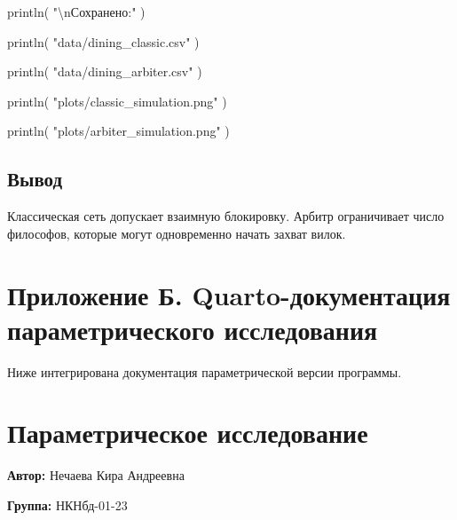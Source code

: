 \documentclass[
  english,
  russian,
  12pt,
  a4paper,
  DIV=11,
  numbers=noendperiod]{scrreprt}
\newenvironment{Shaded}{\begin{snugshade}}{\end{snugshade}}
\newcommand{\FunctionTok}[1]{\textcolor[rgb]{0.28,0.35,0.67}{#1}}
\newcommand{\NormalTok}[1]{\textcolor[rgb]{0.00,0.23,0.31}{#1}}
\newcommand{\SpecialCharTok}[1]{\textcolor[rgb]{0.37,0.37,0.37}{#1}}
\newcommand{\StringTok}[1]{\textcolor[rgb]{0.13,0.47,0.30}{#1}}
\begin{document}
\begin{Shaded}
\begin{Highlighting}[]
\FunctionTok{println}\NormalTok{(}
    \StringTok{"}\SpecialCharTok{\textbackslash{}n}\StringTok{Сохранено:"}
\NormalTok{)}

\FunctionTok{println}\NormalTok{(}
    \StringTok{"data/dining\_classic.csv"}
\NormalTok{)}

\FunctionTok{println}\NormalTok{(}
    \StringTok{"data/dining\_arbiter.csv"}
\NormalTok{)}

\FunctionTok{println}\NormalTok{(}
    \StringTok{"plots/classic\_simulation.png"}
\NormalTok{)}

\FunctionTok{println}\NormalTok{(}
    \StringTok{"plots/arbiter\_simulation.png"}
\NormalTok{)}
\end{Highlighting}
\end{Shaded}

\section{Вывод}\label{ux432ux44bux432ux43eux434}

Классическая сеть допускает взаимную блокировку. Арбитр ограничивает
число философов, которые могут одновременно начать захват вилок.

\chapter*{Приложение Б. Quarto-документация параметрического
исследования}\label{ux43fux440ux438ux43bux43eux436ux435ux43dux438ux435-ux431.-quarto-ux434ux43eux43aux443ux43cux435ux43dux442ux430ux446ux438ux44f-ux43fux430ux440ux430ux43cux435ux442ux440ux438ux447ux435ux441ux43aux43eux433ux43e-ux438ux441ux441ux43bux435ux434ux43eux432ux430ux43dux438ux44f}

Ниже интегрирована документация параметрической версии программы.

\chapter{Параметрическое
исследование}\label{ux43fux430ux440ux430ux43cux435ux442ux440ux438ux447ux435ux441ux43aux43eux435-ux438ux441ux441ux43bux435ux434ux43eux432ux430ux43dux438ux435-1}

\textbf{Автор:} Нечаева Кира Андреевна

\textbf{Группа:} НКНбд-01-23
\end{document}
